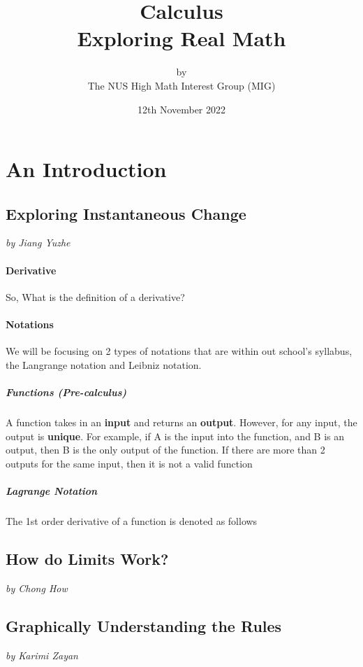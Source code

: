 \documentclass[a4paper,12pt,oneside]{book}
\title{%
  \Huge Calculus \\
  \LARGE  Exploring \textbf{Real} Math
  }
\author{by \\
\Large The NUS High Math Interest Group (MIG) \\
}
\date{\Large 12th November 2022}
\begin{document}
\maketitle

\tableofcontents

\part{An Introduction}

\newpage
\chapter{Exploring Instantaneous Change}
\vspace{-30pt}
\large \textit{by Jiang Yuzhe}

\subsection{Derivative}
So, What is the definition of a derivative?

\subsection{Notations}
We will be focusing on 2 types of notations that are within out school's syllabus, the Langrange notation and Leibniz notation. 
\subsubsection{Functions (Pre-calculus)}
A function takes in an \textbf{input} and returns an \textbf{output}. However, for any input, the output is \textbf{unique}. For example, if A is the input into the function, and B is an output, then B is the only output of the function. If there are more than 2 outputs for the same input, then it is not a valid function
\subsubsection{Lagrange Notation}
The 1st order derivative of a function is denoted as follows
$$$$


\newpage
\chapter{How do Limits Work?}
\vspace{-30pt}
\large \textit{by Chong How}


\newpage
\chapter{Graphically Understanding the Rules}
\vspace{-30pt}
\large \textit{by Karimi Zayan}
\end{document}
